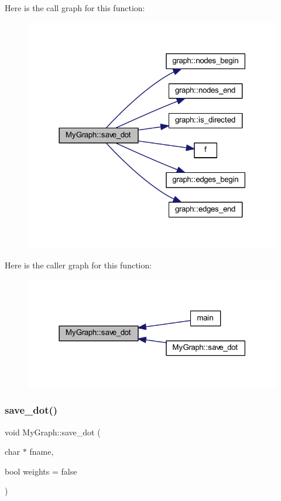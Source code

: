 Here is the call graph for this function\+:
\nopagebreak
\begin{figure}[H]
\begin{center}
\leavevmode
\includegraphics[width=318pt]{class_my_graph_acf68ca166eebb43a80b722c6ef15d22c_cgraph}
\end{center}
\end{figure}
Here is the caller graph for this function\+:
\nopagebreak
\begin{figure}[H]
\begin{center}
\leavevmode
\includegraphics[width=318pt]{class_my_graph_acf68ca166eebb43a80b722c6ef15d22c_icgraph}
\end{center}
\end{figure}
\mbox{\label{class_my_graph_a646cfd85f487b7f7b8fd9f074bd595ca}} 
\subsubsection{\texorpdfstring{save\+\_\+dot()}{save\_dot()}\hspace{0.1cm}{\footnotesize\ttfamily [2/2]}}
{\footnotesize\ttfamily void My\+Graph\+::save\+\_\+dot (\begin{DoxyParamCaption}\item[{char $\ast$}]{fname,  }\item[{bool}]{weights = {\ttfamily false} }\end{DoxyParamCaption})\hspace{0.3cm}{\ttfamily [virtual]}}


